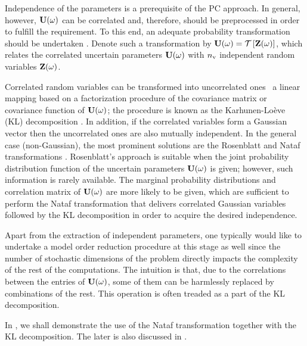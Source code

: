 Independence of the parameters is a prerequisite of the PC approach.
In general, however, $\mathbf{U}(\omega)$ can be correlated and, therefore, should be preprocessed in order to fulfill the requirement.
To this end, an adequate probability transformation should be undertaken \cite{eldred2008}.
Denote such a transformation by $\vU(\o) = \oTransform{\vZ(\o)}$, which relates the correlated uncertain parameters $\mathbf{U}(\omega)$ with ${n_\text{v}}$ independent random variables $\mathbf{Z}(\omega)$.

Correlated random variables can be transformed into uncorrelated ones \via\ a linear mapping based on a factorization procedure of the covariance matrix or covariance function of $\mathbf{U}(\omega)$; the procedure is known as the Karhunen-Lo\`{e}ve (KL) decomposition \cite{ghanem1991}.
In addition, if the correlated variables form a Gaussian vector then the uncorrelated ones are also mutually independent.
In the general case (non-Gaussian), the most prominent solutions are the Rosenblatt \cite{rosenblatt1952} and Nataf transformations \cite{li2008}.
Rosenblatt's approach is suitable when the joint probability distribution function of the uncertain parameters $\mathbf{U}(\omega)$ is given; however, such information is rarely available.
The marginal probability distributions and correlation matrix of $\mathbf{U}(\omega)$ are more likely to be given, which are sufficient to perform the Nataf transformation that delivers correlated Gaussian variables followed by the KL decomposition in order to acquire the desired independence.

Apart from the extraction of independent parameters, one typically would like to undertake a model order reduction procedure at this stage as well since the number of stochastic dimensions of the problem directly impacts the complexity of the rest of the computations.
The intuition is that, due to the correlations between the entries of $\mathbf{U}(\omega)$, some of them can be harmlessly replaced by combinations of the rest. This operation is often treaded as a part of the KL decomposition.

In , we shall demonstrate the use of the Nataf transformation together with the KL decomposition.
The later is also discussed in .
